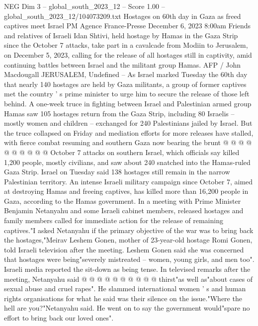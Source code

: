\begin{textsample}{NEG Dim 3 – global\_south\_2023\_12 – Score 1.00 – global\_south\_2023\_12/104073209.txt}  \label{ex:f3_neg_008}
Hostages on 60th day in Gaza as freed captives meet Israel PM Agence France-Presse December 6, 2023 8:00am Friends and relatives of Israeli Idan Shtivi, held hostage by Hamas in the Gaza Strip since the October 7 attacks, take part in a cavalcade from Modiin to Jerusalem, on December 5, 2023, calling for the release of all hostages still in captivity, amid continuing battles between Israel and the militant group Hamas.
AFP / John Macdougall JERUSALEM, Undefined -- As Israel marked Tuesday the 60th day that nearly 140 hostages are held by Gaza militants, a group of former captives met the country ' s prime minister to urge him to secure the release of those left behind.
A one-week truce in fighting between Israel and Palestinian armed group Hamas saw 105 hostages return from the Gaza Strip, including 80 Israelis -- mostly women and children -- exchanged for 240 Palestinians jailed by Israel.
But the truce collapsed on Friday and mediation efforts for more releases have stalled, with fierce combat resuming and southern Gaza now bearing the brunt @ @ @ @ @ @ @ @ @ @ October 7 attacks on southern Israel, which officials say killed 1,200 people, mostly civilians, and saw about 240 snatched into the Hamas-ruled Gaza Strip.
Israel on Tuesday said 138 hostages still remain in the narrow Palestinian territory.
An intense Israeli military campaign since October 7, aimed at destroying Hamas and freeing captives, has killed more than 16,200 people in Gaza, according to the Hamas government.
In a meeting with Prime Minister Benjamin Netanyahu and some Israeli cabinet members, released hostages and family members called for immediate action for the release of remaining captives."I asked Netanyahu if the primary objective of the war was to bring back the hostages,"Meirav Leshem Gonen, mother of 23-year-old hostage Romi Gonen, told Israeli television after the meeting.
Leshem Gonen said she was concerned that hostages were being"severely mistreated -- women, young girls, and men too".
Israeli media reported the sit-down as being tense.
In televised remarks after the meeting, Netanyahu said @ @ @ @ @ @ @ @ @ @ thirst"as well as"about cases of sexual abuse and cruel rapes".
He slammed international women ' s and human rights organisations for what he said was their silence on the issue."Where the hell are you?"Netanyahu said.
He went on to say the government would"spare no effort to bring back our loved ones".

\end{textsample}
